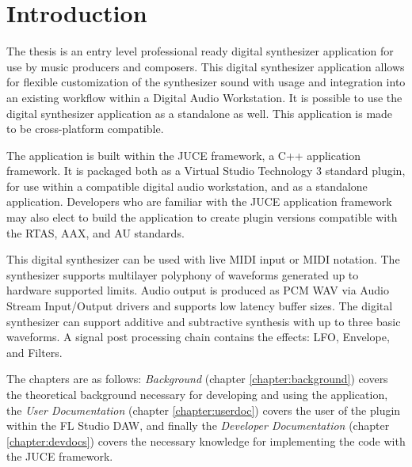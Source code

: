 \documentclass[a4paper,12pt]{report}
\begin{document}



\vspace*{\fill}
\begin{center}

\end{center}
\vfill
\thispagestyle{empty}
\newpage
\setcounter{page}{1}

\tableofcontents

\chapter*{Introduction}
\label{chapter:intro}

The thesis is an entry level professional ready digital synthesizer application for use by music producers and composers. This digital synthesizer application allows for flexible customization of the synthesizer sound with usage and integration into an existing workflow within a Digital Audio Workstation. It is possible to use the digital synthesizer application as a standalone as well. This application is made to be cross-platform compatible.

The application is built within the JUCE framework, a C++ application framework. It is packaged both as a Virtual Studio Technology 3 standard plugin, for use within a compatible digital audio workstation, and as a standalone application. Developers who are familiar with the JUCE application framework may also elect to build the application to create plugin versions compatible with the RTAS, AAX, and AU standards.

This digital synthesizer can be used with live MIDI input or MIDI notation. The synthesizer supports multilayer polyphony of waveforms generated up to hardware supported limits. Audio output is produced as PCM WAV via Audio Stream Input/Output drivers and supports low latency buffer sizes. The digital synthesizer can support additive and subtractive synthesis with up to three basic waveforms. A signal post processing chain contains the effects: LFO, Envelope, and Filters. 

The chapters are as follows: \emph{Background} (chapter \ref{chapter:background}) covers the theoretical background necessary for developing and using the application, the \emph{User Documentation} (chapter \ref{chapter:userdoc}) covers the user of the plugin within the FL Studio DAW, and finally the \emph{Developer Documentation} (chapter \ref{chapter:devdocs}) covers the necessary knowledge for implementing the code with the JUCE framework.
\end{document}
